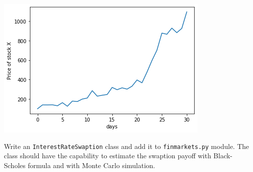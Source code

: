 \begin{Answer}
\begin{center}
  \includegraphics{figures/lesson6_solutions_5_0.png}
\end{center}
\end{Answer}


\begin{Exercise}[title={(\texttt{InterestRateSwaption} class)}]
Write an \texttt{InterestRateSwaption} class and add it to \texttt{finmarkets.py} module. The class should have the capability to estimate the swaption payoff with Black-Scholes formula and with Monte Carlo simulation.
\end{Exercise}

